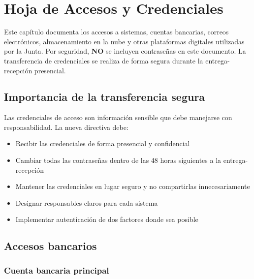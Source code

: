 \chapter{Hoja de Accesos y Credenciales}

Este capítulo documenta los accesos a sistemas, cuentas bancarias, correos electrónicos, almacenamiento en la nube y otras plataformas digitales utilizadas por la Junta. Por seguridad, \textbf{NO} se incluyen contraseñas en este documento. La transferencia de credenciales se realiza de forma segura durante la entrega-recepción presencial.

\section*{Importancia de la transferencia segura}

Las credenciales de acceso son información sensible que debe manejarse con responsabilidad. La nueva directiva debe:

\begin{itemize}
  \item Recibir las credenciales de forma presencial y confidencial
  \item Cambiar todas las contraseñas dentro de las 48 horas siguientes a la entrega-recepción
  \item Mantener las credenciales en lugar seguro y no compartirlas innecesariamente
  \item Designar responsables claros para cada sistema
  \item Implementar autenticación de dos factores donde sea posible
\end{itemize}

\section{Accesos bancarios}

\subsection*{Cuenta bancaria principal}

